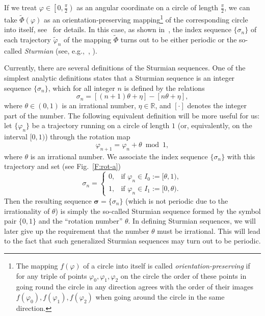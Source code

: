 \documentclass[a4paper,10pt,reqno]{amsart}
\let\cite\citep
\begin{document}
If we treat $\varphi\in\left[0,\frac{\pi}{2}\right)$ as an angular coordinate
on a circle of length $\frac{\pi}{2}$, we can take $\tilde{\varPhi}(\varphi)$
as an orientation-preserving mapping\footnote{The mapping $f(\varphi)$ of a
circle into itself is called \emph{orientation-preserving} if for any triple
of points $\varphi_{0},\varphi_{1},\varphi_{2}$ on the circle the order of
these points in going round the circle in any direction agrees with the order
of their images $f(\varphi_{0}),f(\varphi_{1}),f(\varphi_{2})$ when going
around the circle in the same direction.} of the corresponding circle into
itself, see~\cite{Koz:INFOPROC05:e, Koz:INFOPROC06:e} for details. In this
case, as shown in~\cite{Koz:INFOPROC05:e, Koz:INFOPROC06:e}, the index
sequence $\{\sigma_{n}\}$ of each trajectory $\tilde{\varphi}_{n}$ of the
mapping $\tilde{\varPhi}$ turns out to be either periodic or the so-called
\emph{Sturmian} (see, e.g.,~\cite[Ch.~6]{Fogg02}, \cite[Ch.~2]{Lothaire02}).

Currently, there are several definitions of the Sturmian sequences. One of
the simplest analytic definitions states that a Sturmian sequence is an
integer sequence $\{\sigma_{n}\}$, which for all integer $n$ is defined by
the relations
\[
\sigma_{n}=[(n+1)\theta + \eta]-[n\theta +\eta],
\]
where $\theta\in(0,1)$ is an irrational number, $\eta\in\mathbb{R}$, and
$[\cdot]$ denotes the integer part of the number. The following equivalent
definition will be more useful for us: let $\{\varphi_{n}\}$ be a trajectory
running on a circle of length $1$ (or, equivalently, on the interval $[0,1)$)
through the rotation map
\begin{equation}\label{E:rotmap}
\varphi_{n+1} =\varphi_{n} +\theta\bmod1,
\end{equation}
where $\theta$ is an irrational number. We associate the index sequence
$\{\sigma_{n}\}$ with this trajectory and set (see Fig.~\ref{F:rot-a})
\begin{equation}\label{E:rotmap:i}
\sigma_{n}=\begin{cases}
0,&\text{if~}\varphi_{n}\in I_{0}:=[\theta,1),\\
1,&\text{if~}\varphi_{n}\in I_{1}:=[0,\theta).
\end{cases}
\end{equation}
Then the resulting sequence $\boldsymbol{\sigma}=\{\sigma_{n}\}$ (which is
not periodic due to the irrationality of $\theta$) is simply the so-called
Sturmian sequence formed by the symbol pair $\{0,1\}$ and the ``rotation
number'' $\theta$. In defining Sturmian sequences, we will later give up the
requirement that the number $\theta$ must be irrational. This will lead to
the fact that such generalized Sturmian sequences may turn out to be periodic.
\end{document}
